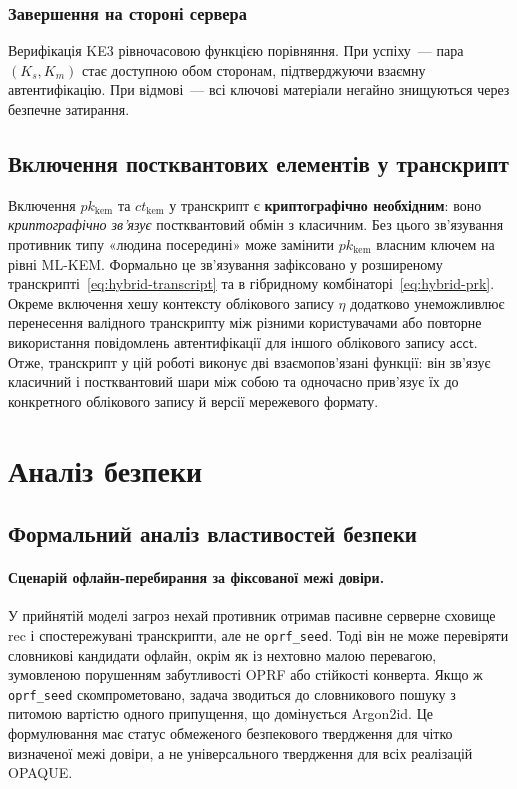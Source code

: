 \documentclass{llncs}
\newcommand{\acct}{\mathsf{acct}}
\begin{document}
\subsubsection{Завершення на стороні сервера}

Верифікація KE3 рівночасовою функцією порівняння. При успіху~---
пара $(K_s, K_m)$ стає доступною обом сторонам, підтверджуючи
взаємну автентифікацію. При відмові~--- всі ключові матеріали
негайно знищуються через безпечне затирання.

\subsection{Включення постквантових елементів у транскрипт}

Включення $pk_{\mathrm{kem}}$ та $ct_{\mathrm{kem}}$ у транскрипт є
\textbf{криптографічно необхідним}: воно \emph{криптографічно зв'язує}
постквантовий обмін з класичним. Без цього зв'язування противник типу
«людина посередині» може замінити $pk_{\mathrm{kem}}$ власним ключем на
рівні ML-KEM. Формально це зв'язування зафіксовано у
розширеному транскрипті~\eqref{eq:hybrid-transcript} та в
гібридному комбінаторі~\eqref{eq:hybrid-prk}. Окреме включення хешу
контексту облікового запису $\eta$
додатково унеможливлює перенесення валідного транскрипту між різними
користувачами або повторне використання повідомлень автентифікації для
іншого облікового запису $\acct$. Отже, транскрипт у цій роботі виконує
дві взаємопов'язані функції: він зв'язує класичний і постквантовий шари між собою та одночасно
прив'язує їх до конкретного облікового запису й версії мережевого
формату.

\section{Аналіз безпеки}

\subsection{Формальний аналіз властивостей безпеки}

\paragraph{Сценарій офлайн-перебирання за фіксованої межі довіри.}
У прийнятій моделі загроз нехай противник отримав пасивне серверне
сховище $\mathrm{rec}$ і спостережувані транскрипти, але не
\texttt{oprf\_seed}. Тоді він не може перевіряти словникові кандидати
офлайн, окрім як із нехтовно малою перевагою, зумовленою порушенням
забутливості OPRF або стійкості конверта. Якщо ж \texttt{oprf\_seed}
скомпрометовано, задача зводиться до словникового пошуку з питомою
вартістю одного припущення, що домінується Argon2id. Це формулювання
має статус обмеженого безпекового твердження для чітко визначеної межі
довіри, а не універсального твердження для всіх реалізацій OPAQUE.
\end{document}
